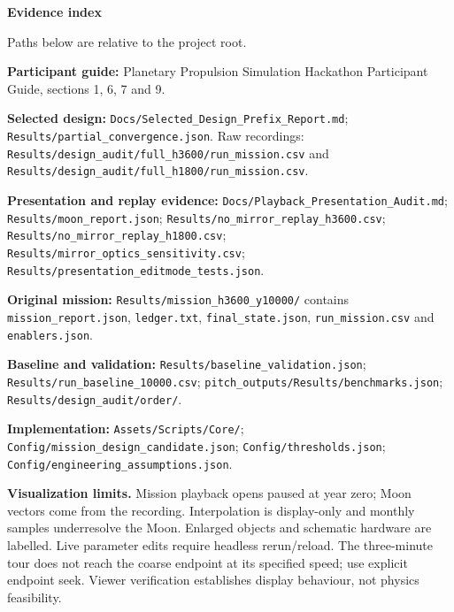 ﻿\documentclass[10pt,a4paper]{article}
\newcommand{\file}[1]{{\footnotesize\nolinkurl{#1}}}
\begin{document}
\par\medskip
\noindent\textbf{Evidence index}\par
{\footnotesize\raggedright
Paths below are relative to the project root.\par
\textbf{Participant guide:} Planetary Propulsion Simulation Hackathon Participant Guide, sections 1, 6, 7 and 9.\par
\textbf{Selected design:} \file{Docs/Selected_Design_Prefix_Report.md}; \file{Results/partial_convergence.json}. Raw recordings: \file{Results/design_audit/full_h3600/run_mission.csv} and \file{Results/design_audit/full_h1800/run_mission.csv}.\par
\textbf{Presentation and replay evidence:} \file{Docs/Playback_Presentation_Audit.md}; \file{Results/moon_report.json}; \file{Results/no_mirror_replay_h3600.csv}; \file{Results/no_mirror_replay_h1800.csv}; \file{Results/mirror_optics_sensitivity.csv}; \file{Results/presentation_editmode_tests.json}.\par
\textbf{Original mission:} \file{Results/mission_h3600_y10000/} contains \file{mission_report.json}, \file{ledger.txt}, \file{final_state.json}, \file{run_mission.csv} and \file{enablers.json}.\par
\textbf{Baseline and validation:} \file{Results/baseline_validation.json}; \file{Results/run_baseline_10000.csv}; \file{pitch_outputs/Results/benchmarks.json}; \file{Results/design_audit/order/}.\par
\textbf{Implementation:} \file{Assets/Scripts/Core/}; \file{Config/mission_design_candidate.json}; \file{Config/thresholds.json}; \file{Config/engineering_assumptions.json}.\par
}
\medskip
\textbf{Visualization limits.} Mission playback opens paused at year zero; Moon vectors come from the recording. Interpolation is display-only and monthly samples underresolve the Moon. Enlarged objects and schematic hardware are labelled. Live parameter edits require headless rerun/reload. The three-minute tour does not reach the coarse endpoint at its specified speed; use explicit endpoint seek. Viewer verification establishes display behaviour, not physics feasibility.
\end{document}
